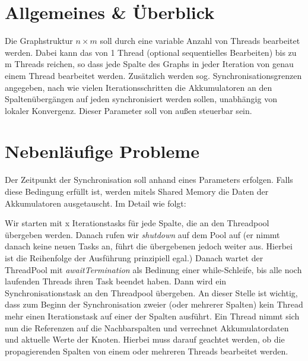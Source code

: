 
\usepackage{pdfpages}
\usepackage{listings}



\newcommand{\subttl}{\textbf{Milestone 1}}
\newcommand{\StudNameOne}{Christoph Rosenhauer (2549220)}
\newcommand{\StudNameTwo}{Lukas Schaal (2539218)}
\newcommand{\StudNameThree}{Jens Heinen (2542182)}


\section{Allgemeines \& Überblick}
Die Graphstruktur $n \times m$ soll durch eine variable Anzahl von Threads bearbeitet werden. Dabei kann das von 1 Thread (optional sequentielles Bearbeiten) bis zu m Threads reichen, so dass jede Spalte des Graphs in jeder Iteration von genau einem Thread bearbeitet werden. 
Zusätzlich werden sog. Synchronisationsgrenzen  angegeben, nach wie vielen Iterationsschritten die Akkumulatoren an den Spaltenübergängen auf jeden synchronisiert werden sollen, unabhängig von lokaler Konvergenz. Dieser Parameter soll von außen steuerbar sein. 

\section{Nebenläufige Probleme}
Der Zeitpunkt der Synchronisation soll anhand eines Parameters erfolgen. Falls diese Bedingung erfüllt ist, werden mitels Shared Memory die Daten der Akkumulatoren ausgetauscht. Im Detail wie folgt:

Wir starten mit x Iterationstasks für jede Spalte, die an den Threadpool übergeben werden. Danach rufen wir \textit{shutdown}  auf dem Pool auf (er nimmt danach keine neuen Tasks an, führt die übergebenen jedoch weiter aus. Hierbei ist die Reihenfolge der Ausführung prinzipiell egal.) Danach wartet der ThreadPool mit \textit{awaitTermination} als Bedinung einer while-Schleife, bis alle noch laufenden Threads ihren Task beendet haben.
Dann wird ein Synchronisationstask an den Threadpool übergeben. An dieser Stelle ist wichtig, dass zum Beginn der Synchronisation zweier (oder mehrerer Spalten) kein Thread mehr einen Iterationstask auf einer der Spalten ausführt. Ein Thread nimmt sich nun die Referenzen auf die Nachbarspalten und verrechnet Akkumulatordaten und aktuelle Werte der Knoten. Hierbei muss darauf geachtet werden, ob die propagierenden Spalten von einem oder mehreren Threads bearbeitet werden.

